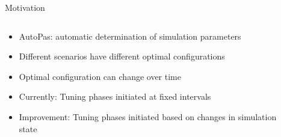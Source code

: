 \maketitle

\begin{frame}[c]{Motivation}{}
	\begin{columns}
		\begin{column}{0.6\textwidth}
			\begin{itemize}
				\item AutoPas: automatic determination of simulation parameters
				\item Different scenarios have different optimal configurations
				\item Optimal configuration can change over time
				\item Currently: Tuning phases initiated at fixed intervals
				\item Improvement: Tuning phases initiated based on changes in simulation state
			\end{itemize}
		\end{column}
		\begin{column}{0.4\textwidth}
		\end{column}
	\end{columns}
\end{frame}

